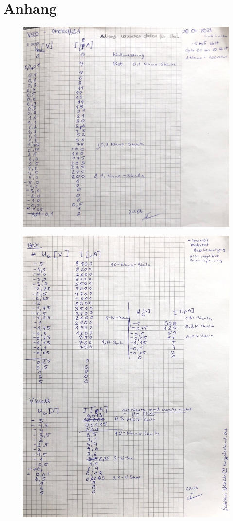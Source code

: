 \section{Anhang}
\begin{figure}
    \centering
    \includegraphics[width=\textwidth]{content/photorot.pdf}
\end{figure}
\begin{figure}
    \centering
    \includegraphics[width=\textwidth]{content/photogrunvio.pdf}
\end{figure}
